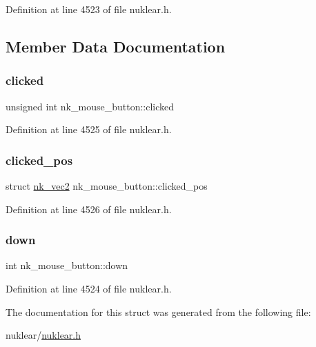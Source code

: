 Definition at line 4523 of file nuklear.\+h.



\subsection{Member Data Documentation}
\mbox{\label{structnk__mouse__button_a1b685639b8ff0c166ece7097f89be423}} 
\subsubsection{\texorpdfstring{clicked}{clicked}}
{\footnotesize\ttfamily unsigned int nk\+\_\+mouse\+\_\+button\+::clicked}



Definition at line 4525 of file nuklear.\+h.

\mbox{\label{structnk__mouse__button_a4a025ef1d8ff957864230a2f72c92983}} 
\subsubsection{\texorpdfstring{clicked\+\_\+pos}{clicked\_pos}}
{\footnotesize\ttfamily struct \mbox{\hyperlink{structnk__vec2}{nk\+\_\+vec2}} nk\+\_\+mouse\+\_\+button\+::clicked\+\_\+pos}



Definition at line 4526 of file nuklear.\+h.

\mbox{\label{structnk__mouse__button_a917be25314608b6c56e648ed14fe29b7}} 
\subsubsection{\texorpdfstring{down}{down}}
{\footnotesize\ttfamily int nk\+\_\+mouse\+\_\+button\+::down}



Definition at line 4524 of file nuklear.\+h.



The documentation for this struct was generated from the following file\+:\begin{DoxyCompactItemize}
\item 
nuklear/\mbox{\hyperlink{nuklear_8h}{nuklear.\+h}}\end{DoxyCompactItemize}
